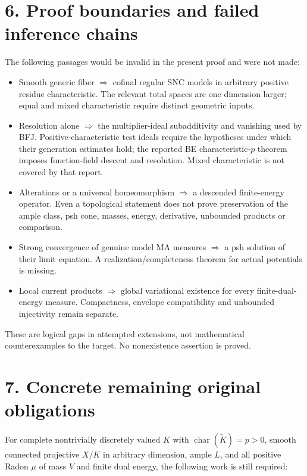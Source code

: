 \documentclass[
  11pt,
]{article}
\providecommand{\tightlist}{%
  \setlength{\itemsep}{0pt}\setlength{\parskip}{0pt}}
\begin{document}
\section{6. Proof boundaries and failed inference
chains}\label{proof-boundaries-and-failed-inference-chains}

The following passages would be invalid in the present proof and were
not made:

\begin{itemize}
\tightlist
\item
  Smooth generic fiber \(\Rightarrow\) cofinal regular SNC models in
  arbitrary positive residue characteristic. The relevant total spaces
  are one dimension larger; equal and mixed characteristic require
  distinct geometric inputs.
\item
  Resolution alone \(\Rightarrow\) the multiplier-ideal subadditivity
  and vanishing used by BFJ. Positive-characteristic test ideals require
  the hypotheses under which their generation estimates hold; the
  reported BE characteristic-\(p\) theorem imposes function-field
  descent and resolution. Mixed characteristic is not covered by that
  report.
\item
  Alterations or a universal homeomorphism \(\Rightarrow\) a descended
  finite-energy operator. Even a topological statement does not prove
  preservation of the ample class, psh cone, masses, energy, derivative,
  unbounded products or comparison.
\item
  Strong convergence of genuine model MA measures \(\Rightarrow\) a psh
  solution of their limit equation. A realization/completeness theorem
  for actual potentials is missing.
\item
  Local current products \(\Rightarrow\) global variational existence
  for every finite-dual-energy measure. Compactness, envelope
  compatibility and unbounded injectivity remain separate.
\end{itemize}

These are logical gaps in attempted extensions, not mathematical
counterexamples to the target. No nonexistence assertion is proved.

\section{7. Concrete remaining original
obligations}\label{concrete-remaining-original-obligations}

For complete nontrivially discretely valued \(K\) with
\(\operatorname{char}(\widetilde K)=p>0\), smooth connected projective
\(X/K\) in arbitrary dimension, ample \(L\), and all positive Radon
\(\mu\) of mass \(V\) and finite dual energy, the following work is
still required:
\end{document}

